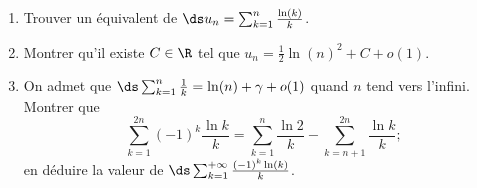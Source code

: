 \begin{enonce}
\begin{exercise}[ID={RMS123 E593, Mines PSI},subtitle={},tags={}]
\begin{enumerate}
  \item Trouver un équivalent de $\ds u_n=\sum_{k=1}^n \frac{\ln(k)}{k}$.
  \item Montrer qu'il existe $C\in\R$ tel que $u_n=\frac12 \ln(n)^2 + C +o(1)$.
  \item On admet que $\ds\sum_{k=1}^n \frac1k=\ln(n)+\gamma + o(1)$ quand $n$ tend vers l'infini. Montrer que
    \begin{equation*}
      \sum_{k=1}^{2n} (-1)^k\frac{\ln k}{k}
      = \sum_{k=1}^n\frac{\ln 2}{k} - \sum_{k=n+1}^{2n} \frac{\ln k}{k} ;
    \end{equation*}
    en déduire la valeur de $\ds\sum_{k=1}^{+\infty} \frac{(-1)^k\ln(k)}{k}$.
\end{enumerate}
\end{exercise}
\begin{solution}
\end{solution}
\end{enonce}
